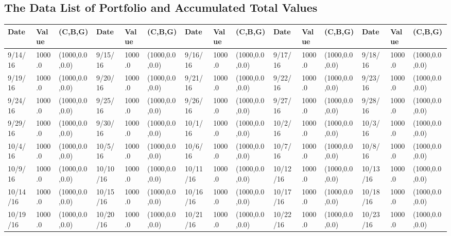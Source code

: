 \documentclass[12pt]{article}
\begin{document}
\subsection{The Data List of Portfolio and Accumulated Total Values}
\newpage
\begin{table}
    \tiny
    \begin{center}
    \begin{tabular}{p{15pt}p{15pt}p{25pt}p{15pt}p{15pt}p{25pt}p{15pt}p{15pt}p{25pt}p{15pt}p{15pt}p{25pt}p{15pt}p{15pt}p{25pt}}
    \toprule
    Date & Value&(C,B,G)&Date & Value&(C,B,G)&Date & Value&(C,B,G)&Date & Value&(C,B,G)&Date & Value&(C,B,G)\\
    \midrule
    9/14/16&1000.0&(1000,0.0,0.0)&9/15/16&1000.0&(1000,0.0,0.0)&9/16/16&1000.0&(1000,0.0,0.0)&9/17/16&1000.0&(1000,0.0,0.0)&9/18/16&1000.0&(1000,0.0,0.0)\\
    9/19/16&1000.0&(1000,0.0,0.0)&9/20/16&1000.0&(1000,0.0,0.0)&9/21/16&1000.0&(1000,0.0,0.0)&9/22/16&1000.0&(1000,0.0,0.0)&9/23/16&1000.0&(1000,0.0,0.0)\\
    9/24/16&1000.0&(1000,0.0,0.0)&9/25/16&1000.0&(1000,0.0,0.0)&9/26/16&1000.0&(1000,0.0,0.0)&9/27/16&1000.0&(1000,0.0,0.0)&9/28/16&1000.0&(1000,0.0,0.0)\\
    9/29/16&1000.0&(1000,0.0,0.0)&9/30/16&1000.0&(1000,0.0,0.0)&10/1/16&1000.0&(1000,0.0,0.0)&10/2/16&1000.0&(1000,0.0,0.0)&10/3/16&1000.0&(1000,0.0,0.0)\\
    10/4/16&1000.0&(1000,0.0,0.0)&10/5/16&1000.0&(1000,0.0,0.0)&10/6/16&1000.0&(1000,0.0,0.0)&10/7/16&1000.0&(1000,0.0,0.0)&10/8/16&1000.0&(1000,0.0,0.0)\\
    10/9/16&1000.0&(1000,0.0,0.0)&10/10/16&1000.0&(1000,0.0,0.0)&10/11/16&1000.0&(1000,0.0,0.0)&10/12/16&1000.0&(1000,0.0,0.0)&10/13/16&1000.0&(1000,0.0,0.0)\\
    10/14/16&1000.0&(1000,0.0,0.0)&10/15/16&1000.0&(1000,0.0,0.0)&10/16/16&1000.0&(1000,0.0,0.0)&10/17/16&1000.0&(1000,0.0,0.0)&10/18/16&1000.0&(1000,0.0,0.0)\\
    10/19/16&1000.0&(1000,0.0,0.0)&10/20/16&1000.0&(1000,0.0,0.0)&10/21/16&1000.0&(1000,0.0,0.0)&10/22/16&1000.0&(1000,0.0,0.0)&10/23/16&1000.0&(1000,0.0,0.0)\\

\end{tabular}
\end{center}
\end{table}
\end{document}
